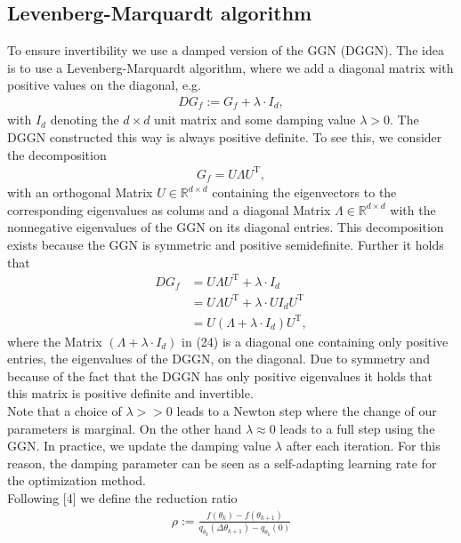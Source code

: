 \documentclass[conference]{IEEEtran}
\begin{document}
	\subsection{Levenberg-Marquardt algorithm }
	\noindent
	To ensure invertibility we use a damped version of the GGN (DGGN). The idea is to use a Levenberg-Marquardt algorithm, where we add a diagonal matrix with positive values on the diagonal, e.g.
	\begin{align}
	DG_{f} := G_{f} + \lambda\cdot I_{d},
	\end{align}
	with $I_{d}$ denoting the $d\times d$ unit matrix and some damping value $\lambda>0$.
	The DGGN constructed this way is always positive definite.
	To see this, we consider the decomposition
	\begin{align}
	G_{f} = U\Lambda U^{\mathrm{T}},
	\end{align}
	with an orthogonal Matrix $U\in\mathbb{R}^{d\times d}$ containing the eigenvectors to the corresponding eigenvalues as colums and a diagonal Matrix $\Lambda\in\mathbb{R}^{d\times d}$ with the nonnegative eigenvalues of the GGN on its diagonal entries. This decomposition exists because the GGN is symmetric and positive semidefinite. Further it holds that
	\begin{align}
	DG_{f} &= U\Lambda U^{\mathrm{T}} + \lambda\cdot I_{d}\\
	&= U\Lambda U^{\mathrm{T}} + \lambda\cdot U I_{d}U^{\mathrm{T}}\\
	&= U\left(\Lambda + \lambda\cdot I_{d}\right)U^{\mathrm{T}},
	\end{align}
	where the Matrix $\left(\Lambda + \lambda\cdot I_{d}\right)$ in (24) is a diagonal one containing only positive entries, the eigenvalues of the DGGN, on the diagonal. Due to symmetry and because of the fact that the DGGN has only positive eigenvalues it holds that this matrix is positive definite and invertible.\\
	Note that a choice of $\lambda>>0$ leads to a Newton step where the change of our parameters is marginal. On the other hand $\lambda\approx 0$ leads to a full step using the GGN. In practice, we update the damping value $\lambda$ after each iteration. For this reason, the damping parameter can be seen as a self-adapting learning rate for the optimization method.\\
	Following [4] we define the reduction ratio
	\begin{align}
	\rho := \frac{f(\theta_{k}) - f(\theta_{k+1})}{q_{\theta_{k}}(\Delta\theta_{k + 1}) - q_{\theta_{k}}(0)}
	\end{align}
\end{document}
